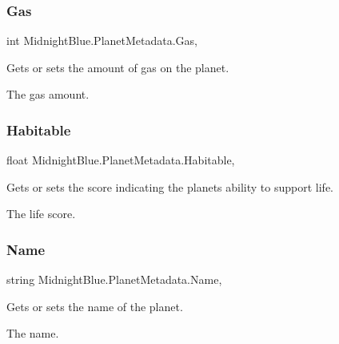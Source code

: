 \subsubsection{\texorpdfstring{Gas}{Gas}}
{\footnotesize\ttfamily int Midnight\+Blue.\+Planet\+Metadata.\+Gas\hspace{0.3cm}{\ttfamily [get]}, {\ttfamily [set]}}



Gets or sets the amount of gas on the planet. 

The gas amount.\hypertarget{class_midnight_blue_1_1_planet_metadata_a918efa02de6f3aae58d4cc3804d149eb}{}\label{class_midnight_blue_1_1_planet_metadata_a918efa02de6f3aae58d4cc3804d149eb} 
\subsubsection{\texorpdfstring{Habitable}{Habitable}}
{\footnotesize\ttfamily float Midnight\+Blue.\+Planet\+Metadata.\+Habitable\hspace{0.3cm}{\ttfamily [get]}, {\ttfamily [set]}}



Gets or sets the score indicating the planets ability to support life. 

The life score.\hypertarget{class_midnight_blue_1_1_planet_metadata_a7afda7361d57bbbf9bb9d6be47167149}{}\label{class_midnight_blue_1_1_planet_metadata_a7afda7361d57bbbf9bb9d6be47167149} 
\subsubsection{\texorpdfstring{Name}{Name}}
{\footnotesize\ttfamily string Midnight\+Blue.\+Planet\+Metadata.\+Name\hspace{0.3cm}{\ttfamily [get]}, {\ttfamily [set]}}



Gets or sets the name of the planet. 

The name.\hypertarget{class_midnight_blue_1_1_planet_metadata_a2aa80bee630ca09d10ab12c7734e1ea4}{}\label{class_midnight_blue_1_1_planet_metadata_a2aa80bee630ca09d10ab12c7734e1ea4} 
